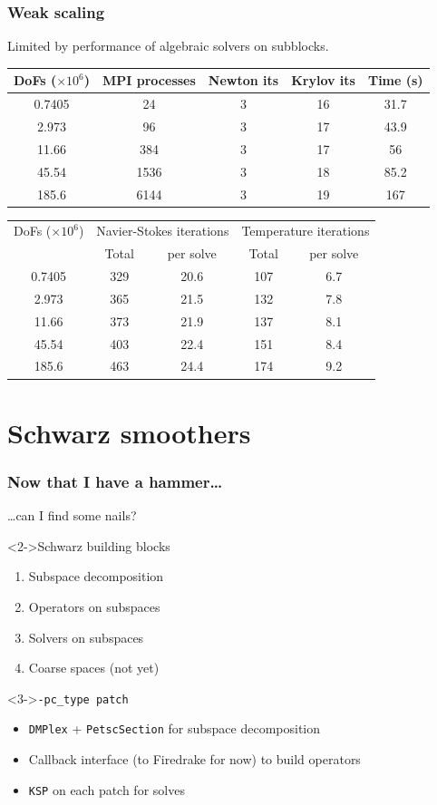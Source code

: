 \documentclass[presentation,aspectratio=43]{beamer}
\begin{document}
\begin{frame}
  \frametitle{Weak scaling}
  Limited by performance of algebraic solvers on subblocks. 
 \begin{center}
    \scriptsize
  \begin{tabular}{c|c|c|c|c}
DoFs ($\times 10^{6}$) & MPI processes & Newton its & Krylov its & Time (s)\\
\hline
0.7405 & 24 & 3 & 16 & 31.7\\
2.973 & 96 & 3 & 17 & 43.9\\
11.66 & 384 & 3 & 17 & 56\\
45.54 & 1536 & 3 & 18 & 85.2\\
185.6 & 6144 & 3 & 19 & 167\\
  \end{tabular}

  \begin{tabular}{c|c|c|c|c}
    DoFs ($\times 10^{6}$) & \multicolumn{2}{|c|}{Navier-Stokes iterations} & \multicolumn{2}{|c}{Temperature iterations}\\
    & Total & per solve & Total & per solve\\
\hline
0.7405 & 329 & 20.6 & 107 & 6.7 \\
2.973  & 365 & 21.5 & 132 & 7.8 \\
11.66  & 373 & 21.9 & 137 & 8.1 \\
45.54  & 403 & 22.4 & 151 & 8.4 \\
185.6  & 463 & 24.4 & 174 & 9.2 \\
  \end{tabular}
  \end{center}
\end{frame}
\section{Schwarz smoothers}

\begin{frame}
  \frametitle{Now that I have a hammer\ldots}
  \ldots can I find some nails?

  \begin{block}<2->{Schwarz building blocks}
    \begin{enumerate}
    \item Subspace decomposition
    \item Operators on subspaces
    \item Solvers on subspaces
    \item Coarse spaces (not yet)
    \end{enumerate}
  \end{block}

  \begin{block}<3->{\texttt{-pc\_type patch}}
    \begin{itemize}
    \item \texttt{DMPlex} + \texttt{PetscSection} for subspace decomposition
    \item Callback interface (to Firedrake for now) to build operators
    \item \texttt{KSP} on each patch for solves
    \end{itemize}
  \end{block}
\end{frame}
\end{document}
